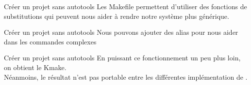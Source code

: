 \begin{frame}[fragile=singleslide]{Créer un projet sans autotools}
  Les  Makefile permettent d'utiliser  des fonctions  de substitutions
  qui  peuvent  nous aider  à  rendre  notre  système plus  générique.
  
\end{frame}

\begin{frame}[fragile=singleslide]{Créer un projet sans autotools}
  Nous pouvons  ajouter des alias  pour nous aider dans  les commandes
  complexes 
  
\end{frame}


\begin{frame}[fragile=singleslide]{Créer un projet sans autotools}
  En puissant ce fonctionnement un peu plus loin, on obtient le Kmake.\\[2ex]

  Néanmoins,  le résultat  n'est  pas portable  entre les  différentes
  implémentation de .
\end{frame}

